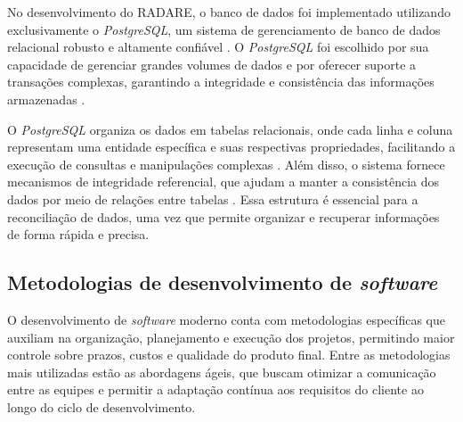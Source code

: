 No desenvolvimento do RADARE, o banco de dados foi implementado utilizando exclusivamente o \textit{PostgreSQL}, um sistema de gerenciamento de banco de dados relacional robusto e altamente confiável \cite{postgresql2024}. O \textit{PostgreSQL} foi escolhido por sua capacidade de gerenciar grandes volumes de dados e por oferecer suporte a transações complexas, garantindo a integridade e consistência das informações armazenadas \cite{acidtransactions}.

O \textit{PostgreSQL} organiza os dados em tabelas relacionais, onde cada linha e coluna representam uma entidade específica e suas respectivas propriedades, facilitando a execução de consultas e manipulações complexas \cite{relationaldatabases}. Além disso, o sistema fornece mecanismos de integridade referencial, que ajudam a manter a consistência dos dados por meio de relações entre tabelas \cite{databaseintegrity}. Essa estrutura é essencial para a reconciliação de dados, uma vez que permite organizar e recuperar informações de forma rápida e precisa.

\subsection{Metodologias de desenvolvimento de \textit{software}}

O desenvolvimento de \textit{software} moderno conta com metodologias específicas que auxiliam na organização, planejamento e execução dos projetos, permitindo maior controle sobre prazos, custos e qualidade do produto final. Entre as metodologias mais utilizadas estão as abordagens ágeis, que buscam otimizar a comunicação entre as equipes e permitir a adaptação contínua aos requisitos do cliente ao longo do ciclo de desenvolvimento.

